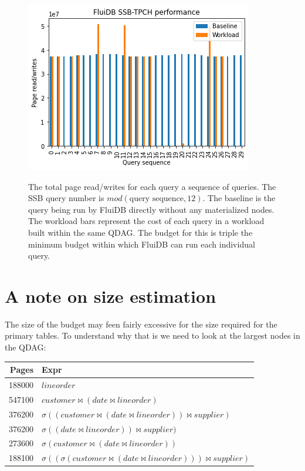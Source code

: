 \begin{figure}[p]
\centering
\includegraphics[width=.9\linewidth]{./imgs/2021-12-03_20-12-36_screenshot.png}
\label{fig:large_budget_plot}
\caption{The total page read/writes for each query a sequence of
  queries. The SSB query number is \(mod(\text{query
    sequence},12)\). The baseline is the query being run by FluiDB
  directly without any materialized nodes. The workload bars represent
  the cost of each query in a workload built within the same QDAG. The
  budget for this is triple the minimum budget within which FluiDB can
  run each individual query.}
\end{figure}

\section{A note on size estimation}

The size of the budget may feen fairly excessive for the size required
for the primary tables. To understand why that is we need to look at
the largest nodes in the QDAG:

\begin{center}
\begin{tabular}{rl}
Pages & Expr\\
\hline
188000 & \(lineorder\)\\
547100 & \(customer \Join (date \Join lineorder)\)\\
376200 & \(\sigma ((customer \Join (date \Join lineorder)) \Join supplier)\)\\
376200 & \(\sigma ((date \Join lineorder)) \Join supplier)\)\\
273600 & \(\sigma (customer \Join (date \Join lineorder))\)\\
188100 & \(\sigma ((\sigma (customer \Join (date \Join lineorder))) \Join supplier)\)\\
\end{tabular}
\end{center}

